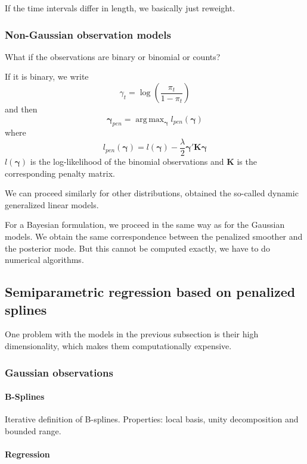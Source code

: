 \documentclass{article}
\DeclareMathOperator*{\argmax}{arg\,max}
\begin{document}
    If the time intervals differ in length, we basically just reweight. 

    \subsubsection{Non-Gaussian observation models}

    What if the observations are binary or binomial or counts?

    If it is binary, we write 
    \[ \gamma_t = \log \left(\frac{\pi_t}{1 - \pi_t}\right)\] 
    and then 
    \[\boldsymbol\gamma_{pen} = \argmax_{\boldsymbol\gamma} l_{pen}(\boldsymbol\gamma)\]
    where 
    \[l_{pen}(\boldsymbol\gamma) = l(\boldsymbol\gamma) - \frac{\lambda}{2} \boldsymbol\gamma'\mathbf K \boldsymbol\gamma\] 
    \(l(\boldsymbol\gamma)\) is the log-likelihood of the binomial observations and \(\mathbf K\) is the corresponding penalty matrix. 
    
    We can proceed similarly for other distributions, obtained the so-called dynamic generalized linear models. 

    For a Bayesian formulation, we proceed in the same way as for the Gaussian models. We obtain the same correspondence between the penalized smoother and the posterior mode. But this cannot be computed exactly, we have to do numerical algorithms. 

    \subsection{Semiparametric regression based on penalized splines}

    One problem with the models in the previous subsection is their high dimensionality, which makes them computationally expensive. 

    \subsubsection{Gaussian observations}

    \paragraph{B-Splines}
    Iterative definition of B-splines. Properties: local basis, unity decomposition and bounded range. 

    \paragraph{Regression}
\end{document}

